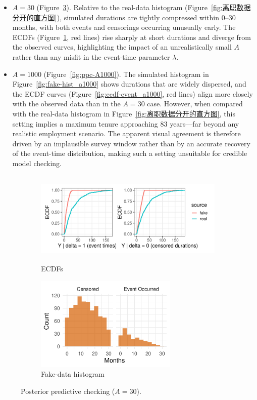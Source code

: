 \begin{itemize}
    \item $A = 30$ (Figure~\ref{fig:ppc-A30}). Relative to the real-data histogram (Figure~\ref{fig:离职数据分开的直方图}), simulated durations are tightly compressed within 0–30 months, with both events and censorings occurring unusually early. The ECDFs (Figure~\ref{fig:ecdf-event_a30}, red lines) rise sharply at short durations and diverge from the observed curves, highlighting the impact of an unrealistically small $A$ rather than any misfit in the event-time parameter $\lambda$.
    \item $A = 1000$ (Figure~\ref{fig:ppc-A1000}). The simulated histogram in Figure~\ref{fig:fake-hist_a1000} shows durations that are widely dispersed, and the ECDF curves (Figure~\ref{fig:ecdf-event_a1000}, red lines) align more closely with the observed data than in the $A=30$ case. However, when compared with the real-data histogram in Figure~\ref{fig:离职数据分开的直方图}, this setting implies a maximum tenure approaching 83 years—far beyond any realistic employment scenario. The apparent visual agreement is therefore driven by an implausible survey window rather than by an accurate recovery of the event-time distribution, making such a setting unsuitable for credible model checking.
\end{itemize}
\begin{figure}[H]
\centering
\begin{subfigure}[t]{0.64\textwidth}
  \centering
  \includegraphics[height=4.5cm, width=\textwidth]{images/ppc_two_a30.pdf}  %
  \caption{{\small ECDFs}}
  \label{fig:ecdf-event_a30}
\end{subfigure}
\begin{subfigure}[t]{0.351\textwidth}
  \centering
  \includegraphics[height=4.5cm,width=\linewidth]{images/fake_duration_hist_a30.pdf}   %
  \caption{{\small Fake-data histogram}}
  \label{fig:fake-hist_a30}
\end{subfigure}
\caption{{\small Posterior predictive checking ($A=30$).}}
\label{fig:ppc-A30}
\end{figure}
